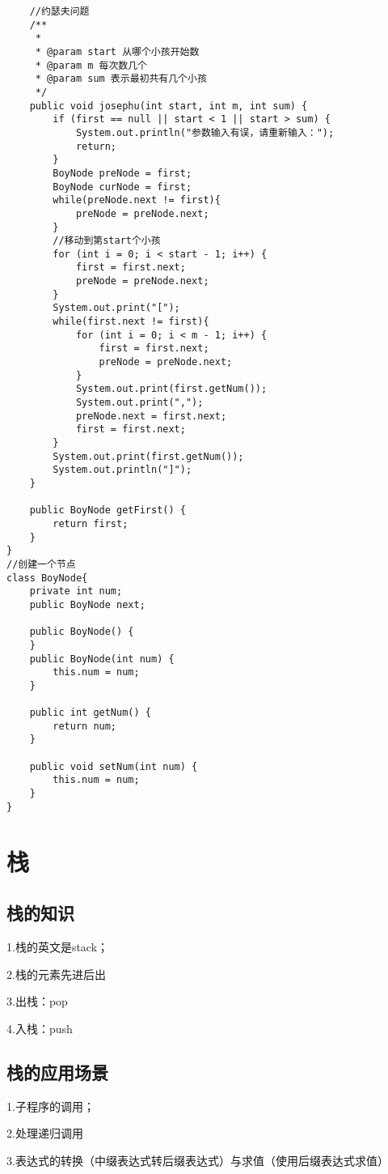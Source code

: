\documentclass[a4paper]{report}
\begin{document}
\begin{lstlisting}
    //约瑟夫问题
    /**
     *
     * @param start 从哪个小孩开始数
     * @param m 每次数几个
     * @param sum 表示最初共有几个小孩
     */
    public void josephu(int start, int m, int sum) {
        if (first == null || start < 1 || start > sum) {
            System.out.println("参数输入有误，请重新输入：");
            return;
        }
        BoyNode preNode = first;
        BoyNode curNode = first;
        while(preNode.next != first){
            preNode = preNode.next;
        }
        //移动到第start个小孩
        for (int i = 0; i < start - 1; i++) {
            first = first.next;
            preNode = preNode.next;
        }
        System.out.print("[");
        while(first.next != first){
            for (int i = 0; i < m - 1; i++) {
                first = first.next;
                preNode = preNode.next;
            }
            System.out.print(first.getNum());
            System.out.print(",");
            preNode.next = first.next;
            first = first.next;
        }
        System.out.print(first.getNum());
        System.out.println("]");
    }

    public BoyNode getFirst() {
        return first;
    }
}
//创建一个节点
class BoyNode{
    private int num;
    public BoyNode next;

    public BoyNode() {
    }
    public BoyNode(int num) {
        this.num = num;
    }

    public int getNum() {
        return num;
    }

    public void setNum(int num) {
        this.num = num;
    }
}
\end{lstlisting}
\chapter{栈}
\section{栈的知识}
1.栈的英文是stack；

2.栈的元素先进后出

3.出栈：pop

4.入栈：push
\section{栈的应用场景}

1.子程序的调用；

2.处理递归调用

3.表达式的转换（中缀表达式转后缀表达式）与求值（使用后缀表达式求值）
\end{document}

